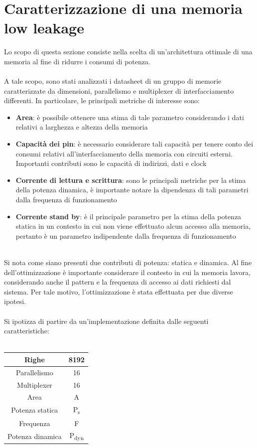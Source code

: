 \documentclass[11pt,  english, makeidx, a4paper, titlepage, oneside]{book}
\begin{document}
\section{Caratterizzazione di una memoria low leakage}
Lo scopo di questa sezione consiste nella scelta di un'architettura ottimale di una memoria al fine di ridurre i consumi di potenza.
\\\\
A tale scopo, sono stati analizzati i datasheet di un gruppo di memorie caratterizzate da dimensioni, parallelismo e multiplexer di interfacciamento differenti. In particolare, le principali metriche di interesse sono:
\begin{itemize}
\item \textbf{Area}: è possibile ottenere una stima di tale parametro considerando i dati relativi a larghezza e altezza della memoria\\
\item \textbf{Capacità dei pin}: è necessario considerare tali capacità per tenere conto dei consumi relativi all'interfacciamento della memoria con circuiti esterni. Importanti contributi sono le capacità di indirizzi, dati e clock\\
\item \textbf{Corrente di lettura e scrittura}: sono le principali metriche per la stima della potenza dinamica, è importante notare la dipendenza di tali parametri dalla frequenza di funzionamento\\
\item \textbf{Corrente stand by}: è il principale parametro per la stima della potenza statica in un contesto in cui non viene effettuato alcun accesso alla memoria, pertanto è un parametro indipendente dalla frequenza di funzionamento\\\\
\end{itemize}
Si nota come siano presenti due contributi di potenza: statica e dinamica. Al fine dell'ottimizzazione è importante considerare il contesto in cui la memoria lavora, considerando anche il pattern e la frequenza di accesso ai dati richiesti dal sistema. Per tale motivo, l'ottimizzazione è stata effettuata per due diverse ipotesi.
\\\\
Si ipotizza di partire da un'implementazione definita dalle seguenti caratteristiche:
\\\\
\begin{center}
	\begin{tabular}{|c|c|}
	\hline
	Righe & 8192\\
	\hline
	Parallelismo & 16\\
	\hline
	Multiplexer & 16\\
	\hline
	Area & A\\
	\hline
	Potenza statica & P\textsubscript{s}\\
	\hline
	Frequenza & F\\
	\hline
	Potenza dinamica & P\textsubscript{dyn}\\
	\hline
	\end{tabular}	
\end{center}
\vspace{0.3cm}
\end{document}
